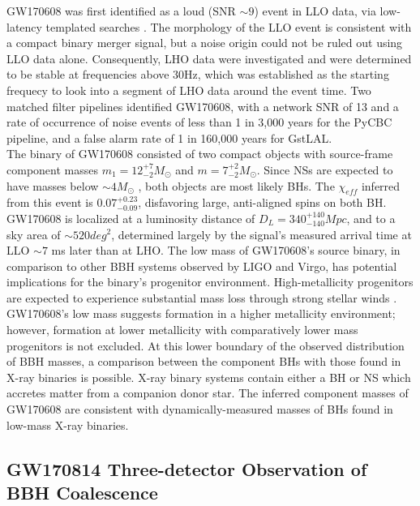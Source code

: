 \documentclass[binding=0.6cm, LaM]{sapthesis}
\begin{document}
	GW170608 was first identified as a loud (SNR $\sim9$) event in LLO data,
	via low-latency templated searches \cite{138}.	
	The morphology of the LLO event is consistent with a compact binary merger signal, 
	but a noise origin could not be ruled out using LLO data alone. 
	Consequently, LHO data were investigated and were determined to be stable 
	at frequencies above 30Hz, which was established as the starting frequecy to look into a segment of LHO data around the event time.
	Two matched filter pipelines identified GW170608, with a network SNR of 13 
	and a rate of occurrence of noise events of less than 1 in 3,000 years for the PyCBC pipeline, 
	and a false alarm rate of 1 in 160,000 years for GstLAL. \\
	The binary of GW170608 consisted of two compact objects with source-frame component masses 
	$m_1 =12^{+7}_{-2}M_\odot$ and $m =7^{+2}_{-2}M_\odot$.  
	Since NSs are expected to have masses below $\sim 4M_\odot$ \cite{141},
	both objects are most likely BHs. 
	The $\chi_{eff}$ inferred from this event is $0.07^{+0.23}_{−0.09}$,
	disfavoring large, anti-aligned spins on both BH. \\
	GW170608 is localized at a luminosity distance of  $D_L = 340^{+140}_{−140}Mpc$, and to a sky area of $\sim520 deg^2$, determined largely by the signal’s measured arrival time at LLO $\sim7$ ms later than at LHO. 
	The low mass of GW170608’s source binary, in comparison to other BBH systems 
	observed by LIGO and Virgo, has potential implications for the binary’s progenitor environment. 
	High-metallicity progenitors are expected to experience substantial mass loss through strong stellar winds \cite{142}.
	GW170608’s low mass suggests formation in a higher metallicity environment; 
	however, formation at lower metallicity with comparatively lower mass progenitors is not excluded. 
	At this lower boundary of the observed distribution of BBH masses, 
	a comparison between the component BHs with those found in X-ray binaries is possible.
	X-ray binary systems contain either a BH or NS which accretes matter from a companion donor star. 
	The inferred component masses of GW170608 are consistent with dynamically-measured masses of BHs found in low-mass X-ray binaries.

\subsection{GW170814 Three-detector Observation of BBH Coalescence}	
	
\end{document}
